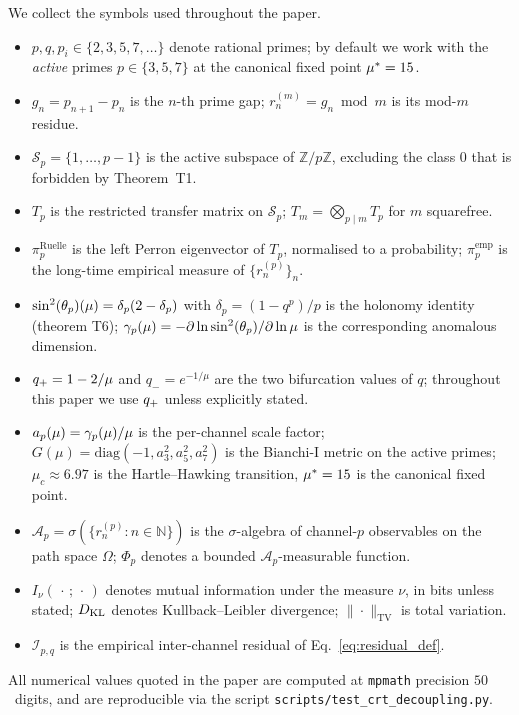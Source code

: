 We collect the symbols used throughout the paper.
\begin{itemize}[itemsep=2pt,leftmargin=*]
  \item $p, q, p_i \in \{2, 3, 5, 7, \ldots\}$ denote rational primes;
    by default we work with the \emph{active} primes
    $p \in \{3, 5, 7\}$ at the canonical fixed point
    ${\mu^{*}} = 15$.
  \item $g_n = p_{n+1} - p_n$ is the $n$-th prime gap;
    $r_n^{(m)} = g_n \bmod m$ is its mod-$m$ residue.
  \item $\mathcal{S}_p = \{1, \ldots, p-1\}$ is the active subspace
    of $\mathbb{Z}/p\mathbb{Z}$, excluding the class $0$ that is
    forbidden by Theorem~T1.
  \item $T_p$ is the restricted transfer matrix on $\mathcal{S}_p$;
    $T_m = \bigotimes_{p \mid m} T_p$ for $m$ squarefree.
  \item $\pi_p^{\mathrm{Ruelle}}$ is the left Perron eigenvector of
    $T_p$, normalised to a probability;
    $\pi_p^{\mathrm{emp}}$ is the long-time empirical measure of
    $\{r_n^{(p)}\}_n$.
  \item $\sin^2(\theta_{p})(\mu) = \delta_p(2 - \delta_p)$ with
    $\delta_p = (1 - q^p)/p$ is the holonomy
    identity (theorem T6); $\gamma_{p}(\mu) = -\partial \ln \sin^2(\theta_{p})/\partial \ln \mu$
    is the corresponding anomalous dimension.
  \item $q_{+} = 1 - 2/\mu$ and $q_- = e^{-1/\mu}$ are the two
    bifurcation values of $q$; throughout this paper we use
    $q_{+}$ unless explicitly stated.
  \item $a_p(\mu) = \gamma_{p}(\mu)/\mu$ is the per-channel scale
    factor;
    $G(\mu) = \mathrm{diag}(-1, a_3^2, a_5^2, a_7^2)$ is the
    Bianchi-I metric on the active primes;
    $\mu_c \approx 6.97$ is the Hartle--Hawking transition,
    ${\mu^{*}} = 15$ is the canonical fixed point.
  \item $\mathcal{A}_p = \sigma(\{r_n^{(p)} : n \in \mathbb{N}\})$ is
    the $\sigma$-algebra of channel-$p$ observables on the path
    space $\Omega$;
    $\Phi_p$ denotes a bounded $\mathcal{A}_p$-measurable function.
  \item $I_{\nu}(\,\cdot\,;\,\cdot\,)$ denotes mutual information
    under the measure $\nu$, in bits unless stated; $D_{\mathrm{KL}}$ denotes
    Kullback--Leibler divergence;
    $\|\cdot\|_{\mathrm{TV}}$ is total variation.
  \item $\mathcal{I}_{p,q}$ is the empirical inter-channel residual
    of Eq.~\eqref{eq:residual_def}.
\end{itemize}

All numerical values quoted in the paper are computed at
\texttt{mpmath} precision $50$~digits, and are reproducible via the
script \texttt{scripts/test\_crt\_decoupling.py}.
